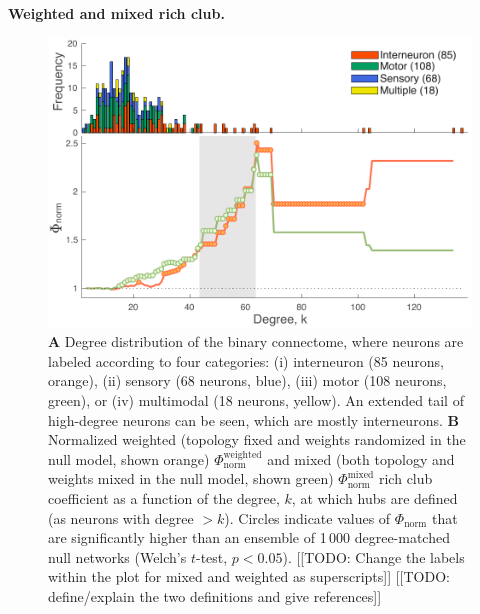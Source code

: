 \documentclass[10pt,letterpaper]{article}
\begin{document}
{%
{\bf Weighted and mixed rich club.}
\begin{figure}[h]
\centering
    \includegraphics[width=1\textwidth]{weightedRCALL.pdf}
    \caption{\textbf{A} Degree distribution of the binary connectome, where neurons are labeled according to four categories:
(i) interneuron (85 neurons, orange),
(ii) sensory (68 neurons, blue),
(iii) motor (108 neurons, green), or
(iv) multimodal (18 neurons, yellow).
An extended tail of high-degree neurons can be seen, which are mostly interneurons.
\textbf{B}
Normalized weighted (topology fixed and weights randomized in the null model, shown orange) $\Phi_\mathrm{norm}^\mathrm{weighted}$ and mixed (both topology and weights mixed in the null model, shown green) $\Phi_\mathrm{norm}^\mathrm{mixed}$ rich club coefficient as a function of the degree, $k$, at which hubs are defined (as neurons with degree $>k$).
Circles indicate values of $\Phi_\mathrm{norm}$ that are significantly higher than an ensemble of 1\,000 degree-matched null networks (Welch's $t$-test, $p < 0.05$).
[[TODO: Change the labels within the plot for mixed and weighted as superscripts]]
[[TODO: define/explain the two definitions and give references]]
\label{fig:S_weightedRC}
}
\end{figure}

}
\end{document}

